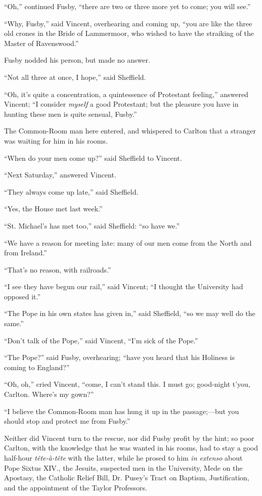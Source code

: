 ``Oh,'' continued Fusby, ``there are two or three more
yet to come; you will see.''

``Why, Fusby,'' said Vincent, overhearing and coming up,
``you are like the three old crones in the Bride of Lammermoor,
who wished to have the straiking of the Master of Ravenswood.''

Fusby nodded his person, but made no answer.

``Not all three at once, I hope,'' said Sheffield.

``Oh, it's quite a concentration, a quintessence of Protestant
feeling,'' answered Vincent; ``I consider \emph{myself} a good
Protestant; but the pleasure you have in hunting these men is quite
sensual, Fusby.''

The Common-Room man here entered, and whispered to Carlton that a
stranger was waiting for him in his rooms.

``When do your men come up?'' said Sheffield to Vincent.

``Next Saturday,'' answered Vincent.

``They always come up late,'' said Sheffield.

``Yes, the House met last week.''

``St. Michael's has met too,'' said Sheffield: ``so
have we.''

``We have a reason for meeting late: many of our men come from
the North and from Ireland.''

``That's no reason, with railroads.''

``I see they have begun our rail,'' said Vincent; ``I
thought the University had opposed it.''

``The Pope in his own states has given in,'' said
Sheffield, ``so we may well do the same.''

``Don't talk of the Pope,'' said Vincent, ``I'm sick of
the Pope.''

``The Pope?'' said Fusby, overhearing; ``have you heard
that his Holiness is coming to England?''

``Oh, oh,'' cried Vincent, ``come, I can't stand this.
I must go; good-night t'you, Carlton. Where's my gown?''

``I believe the Common-Room man has hung it up in the passage;—but
you should stop and protect me from Fusby.''

Neither did Vincent turn to the rescue, nor did Fusby profit by the
hint; so poor Carlton, with the knowledge that he was wanted in his
rooms, had to stay a good half-hour \emph{tête-à-tête} with the
latter, while he prosed to him \emph{in extenso} about Pope Sixtus
XIV., the Jesuits, suspected men in the University, Mede on the
Apostasy, the Catholic Relief Bill, Dr. Pusey's Tract on Baptism,
Justification, and the appointment of the Taylor Professors.

